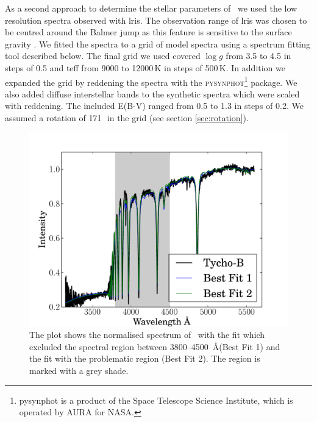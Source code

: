 As a second approach to determine the stellar parameters of \starb\ we used the low resolution spectra observed with \gls{lris}.  The observation range of \gls{lris} was chosen to be centred around the Balmer jump as this feature is sensitive to the surface gravity \citep{2007PASP..119..605B}. We fitted the spectra to a grid of model spectra \citep[]{2005A&A...442.1127M} using a spectrum fitting tool  described below. The final grid we used covered $\log{g}$ from 3.5 to 4.5 in steps of 0.5 and \gls{teff} from 9000 to 12000\,K in steps of 500\,K. In addition we expanded the grid by reddening the spectra with the \textsc{pysynphot}\footnote{pysynphot is a product of the Space Telescope Science Institute, which is operated by AURA for NASA.} package. We also added diffuse interstellar bands  \citep{1937PASP...49..224B, 1966ZA.....64..512H, 1967IAUS...31...85H, 1975ApJ...196..129H, 1995ARA&A..33...19H, 1994dib..nasa...31H, 1994A&AS..106...39J, 1958ApJ...128...57W} to the synthetic spectra which were scaled with reddening. The included E(B-V) ranged from 0.5 to 1.3 in steps of 0.2. We assumed a rotation of 171\,\kms\ in the grid  (see section \ref{sec:rotation}).

\begin{figure}[tb]

\includegraphics[width=1.\textwidth]{chapter_sn1572_hires/plots/starb_spec_comp.pdf} 

\caption[Fit of low resolution spectrum of Tycho-B]{The plot shows the normalised spectrum of \starb\ with the fit which excluded the spectral region between 3800--4500~\AA (Best Fit 1) and the fit with the problematic region (Best Fit 2). The region is marked with a grey shade.  }
\label{fig:starb_spec_comp}
\end{figure}


